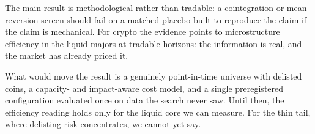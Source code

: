 \documentclass[11pt]{article}
\begin{document}
The main result is methodological rather than tradable: a cointegration or mean-reversion screen
should fail on a matched placebo built to reproduce the claim if the claim is mechanical. For
crypto the evidence points to microstructure efficiency in the liquid majors at
tradable horizons: the information is real, and the market has already priced it.

What would move the result is a genuinely point-in-time universe with delisted coins, a capacity- and impact-aware cost model, and a single preregistered configuration evaluated once on data the
search never saw. Until then, the efficiency reading holds only for the liquid core we can measure. For the thin tail,
where delisting risk concentrates, we cannot yet say.

\end{document}
